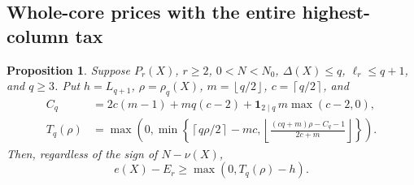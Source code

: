 \documentclass[11pt,a4paper]{article}
\newcommand{\floor}[1]{\left\lfloor#1\right\rfloor}
\newcommand{\ceil}[1]{\left\lceil#1\right\rceil}
\newtheorem{proposition}[theorem]{Proposition}
\theoremstyle{definition}
\begin{document}
\subsection{Whole-core prices with the entire highest-column tax}
\begin{proposition}\label{prop:general-price}
Suppose $P_r(X)$, $r\ge2$, $0<N<N_0$, $\Delta(X)\le q$, $\ell_r\le q+1$, and $q\ge3$. Put $h=L_{q+1}$, $\rho=\rho_q(X)$, $m=\floor{q/2}$, $c=\ceil{q/2}$, and
\[
\begin{split}
 C_q&=2c(m-1)+mq(c-2)+\mathbf1_{2\mid q}\,m\max(c-2,0),\\
 T_q(\rho)&=\max\left(0,\min\left\{\ceil{q\rho/2}-mc,
 \floor{\frac{(cq+m)\rho-C_q-1}{2c+m}}\right\}\right).
\end{split}
\]
Then, regardless of the sign of $N-\nu(X)$,
\begin{equation}\label{eq:general-price}
 e(X)-E_r\ge\max(0,T_q(\rho)-h).
\end{equation}
\end{proposition}
\end{document}
